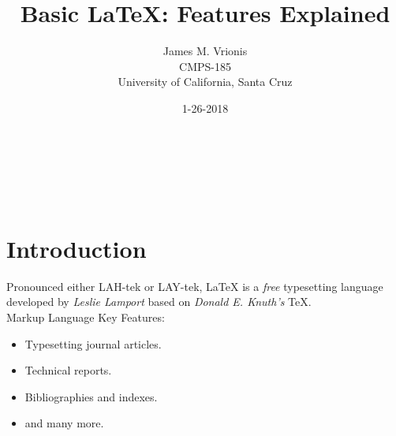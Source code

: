 %
%


\title{Basic \LaTeX{}: Features Explained} \\
\author{James M. Vrionis\\
        CMPS-185 \\
        University of California, Santa Cruz
        \date{1-26-2018} 
       }
\maketitle 

~\cite{wiki_tables}

\section{Introduction} 
Pronounced either LAH-tek or LAY-tek, 
\LaTeX{} is a \textit{free} typesetting language 
developed by \textit{Leslie Lamport}  
based on \textit{Donald E. Knuth's}  
\TeX{}.\\

Markup Language Key Features: ~\cite{rjgunning_gunning_2015} 
\begin{itemize}[label={}]
   \item Typesetting journal articles.
   \item Technical reports. 
   \item Bibliographies and indexes.
   \item and many more.
\end{itemize}

